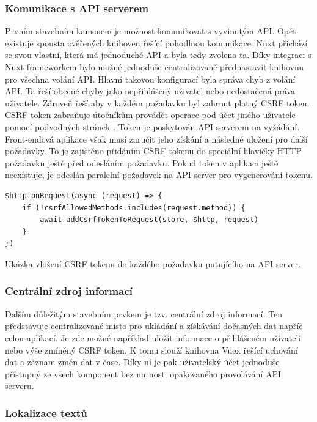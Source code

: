 		\subsubsection{Komunikace s API serverem}

		Prvním stavebním kamenem je možnost komunikovat s vyvinutým \ac{API}.
		Opět existuje spousta ověřených knihoven řešící pohodlnou komunikace.
		Nuxt přichází se svou vlastní, která má jednoduché \ac{API} a byla tedy zvolena ta.
		Díky integraci s Nuxt frameworkem bylo možné jednoduše centralizovaně přednastavit knihovnu pro všechna volání \ac{API}.
		Hlavní takovou konfigurací byla správa chyb z volání \ac{API}.
		Ta řeší obecné chyby jako nepřihlášený uživatel nebo nedostačená práva uživatele.
		Zároveň řeší aby v každém požadavku byl zahrnut platný \noindent\ac{CSRF} token.
		\ac{CSRF} token zabraňuje útočníkům provádět operace pod účet jiného uživatele pomocí podvodných stránek \cite{csrf}.
		Token je poskytován \ac{API} serverem na vyžádání.
		Front-endová aplikace však musí zaručit jeho získání a následné uložení pro další požadavky.
		To je zajištěno přidáním \ac{CSRF} tokenu do speciální hlavičky \ac{HTTP} požadavku ještě před odesláním požadavku.
		Pokud token v aplikaci ještě neexistuje, je odeslán paralelní požadavek na \ac{API} server pro vygenerování tokenu.

		\begin{lstlisting}
$http.onRequest(async (request) => {
	if (!csrfAllowedMethods.includes(request.method)) {
		await addCsrfTokenToRequest(store, $http, request)
	}
})
		\end{lstlisting}
		Ukázka vložení CSRF tokenu do každého požadavku putujícího na API server. %

		\subsubsection{Centrální zdroj informací}

		Dalším důležitým stavebním prvkem je tzv. centrální zdroj informací.
		Ten představuje centralizované místo pro ukládání a získávání dočasných dat napříč celou aplikací.
		Je zde možné například uložit informace o přihlášeném uživateli nebo výše zmíněný \ac{CSRF} token.
		K tomu slouží knihovna Vuex řešící uchování dat a záznam změn dat v čase.
		Díky ní je pak uživatelský účet jednoduše přístupný ze všech komponent bez nutnosti opakovaného provolávání
		\ac{API} serveru.

		\subsubsection{Lokalizace textů}

